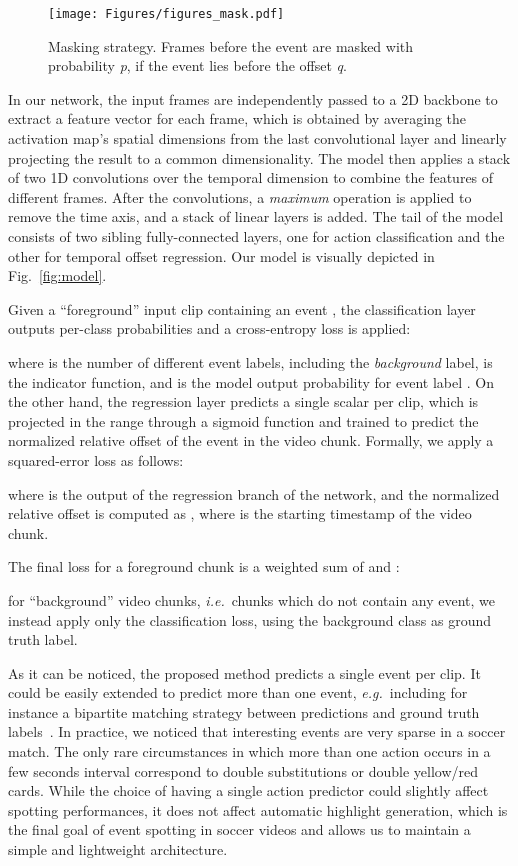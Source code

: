 \documentclass[a4paper,conference]{IEEEtran}
\def \ie {\emph{i.e.}}
\def \eg {\emph{e.g.}}
\begin{document}
\label{sub:masking}
\begin{figure}[t]
\centering
\texttt{[image: Figures/figures\_mask.pdf]}
\caption{Masking strategy. Frames before the event are masked with probability \textit{p}, if the event lies before the offset \textit{q}.}
\label{fig:masking}
\end{figure}



In our network, the  input frames are independently passed to a 2D backbone to extract a feature vector for each frame, which is obtained by averaging the activation map's spatial dimensions from the last convolutional layer and linearly projecting the result to a common dimensionality. The model then applies a stack of two 1D convolutions over the temporal dimension to combine the features of different frames. After the convolutions, a \textit{maximum} operation is applied to remove the time axis, and a stack of linear layers is added. The tail of the model consists of two sibling fully-connected layers, one for action classification and the other for temporal offset regression. 
Our model is visually depicted in Fig.~\ref{fig:model}. 


Given a ``foreground'' input clip containing an event , the classification layer outputs per-class probabilities and a cross-entropy loss is applied:

where  is the number of different event labels, including the \textit{background} label,  is the indicator function, and  is the model output probability for event label .
On the other hand, the regression layer predicts a single scalar per clip, which is projected in the range  through a sigmoid function and trained to predict the normalized relative offset of the event in the video chunk. Formally, we apply a squared-error loss as follows:

where  is the output of the regression branch of the network, and the normalized relative offset  is computed as , where  is the starting timestamp of the video chunk.

The final loss for a foreground chunk is a weighted sum of  and :

for ``background'' video chunks, \ie~chunks which do not contain any event, we instead apply only the classification loss, using the background class as ground truth label.

As it can be noticed, the proposed method predicts a single event per clip. It could be easily extended to predict more than one event, \eg~including for instance a bipartite matching strategy between predictions and ground truth labels~\cite{carion2020end}. In practice, we noticed that interesting events are very sparse in a soccer match. The only rare circumstances in which more than one action occurs in a few seconds interval correspond to  double substitutions or double yellow/red cards. While the choice of having a single action predictor could slightly affect spotting performances, it does not affect automatic highlight generation, which is the final goal of event spotting in soccer videos and allows us to maintain a simple and lightweight architecture.
\end{document}
